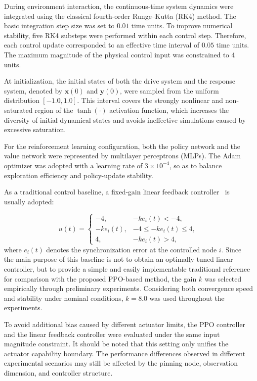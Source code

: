 \documentclass[10pt,twocolumn]{article}
\theoremstyle{definition}
\begin{document}
During environment interaction, the continuous-time system dynamics were integrated using the classical fourth-order Runge--Kutta (RK4) method. The basic integration step size was set to $0.01$ time units. To improve numerical stability, five RK4 substeps were performed within each control step. Therefore, each control update corresponded to an effective time interval of $0.05$ time units. The maximum magnitude of the physical control input was constrained to 4 units.

At initialization, the initial states of both the drive system and the response system, denoted by $\mathbf{x}(0)$ and $\mathbf{y}(0)$, were sampled from the uniform distribution $[-1.0,1.0]$. This interval covers the strongly nonlinear and non-saturated region of the $\tanh(\cdot)$ activation function, which increases the diversity of initial dynamical states and avoids ineffective simulations caused by excessive saturation.

For the reinforcement learning configuration, both the policy network and the value network were represented by multilayer perceptrons (MLPs). The Adam optimizer was adopted with a learning rate of $3\times 10^{-4}$, so as to balance exploration efficiency and policy-update stability.

As a traditional control baseline, a fixed-gain linear feedback controller~\cite{yassen2005controlling} is usually adopted:

\begin{equation}
	u(t)=
	\begin{cases}
		-4, & -k e_i(t)<-4,\\
		-k e_i(t), & -4\leq -k e_i(t)\leq 4,\\
		4, & -k e_i(t)>4,
	\end{cases}
	\label{eq:linear_feedback_baseline}
\end{equation}
where $e_i(t)$ denotes the synchronization error at the controlled node $i$. Since the main purpose of this baseline is not to obtain an optimally tuned linear controller, but to provide a simple and easily implementable traditional reference for comparison with the proposed PPO-based method, the gain $k$ was selected empirically through preliminary experiments. Considering both convergence speed and stability under nominal conditions, $k=8.0$ was used throughout the experiments.

To avoid additional bias caused by different actuator limits, the PPO controller and the linear feedback controller were evaluated under the same input magnitude constraint. It should be noted that this setting only unifies the actuator capability boundary. The performance differences observed in different experimental scenarios may still be affected by the pinning node, observation dimension, and controller structure.
\end{document}
